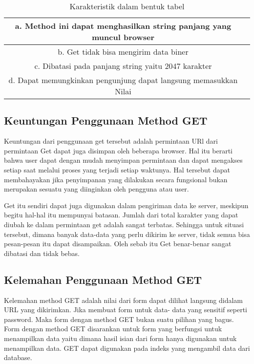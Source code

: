 \begin{table} [ht]
\caption{Karakteristik dalam bentuk tabel}
\centering
\begin {tabular} {|cc|}
\hline
a.	Method ini dapat menghasilkan string panjang yang muncul browser & \\
\hline
b.	Get tidak bisa mengirim data biner &\\
\hline
c.	Dibatasi pada panjang string yaitu 2047 karakter & \\
\hline
d.	Dapat memungkinkan pengunjung dapat langsung memasukkan Nilai & \\
\hline
\end{tabular}
\label{ltabel}
\end{table}

\subsection{Keuntungan Penggunaan Method GET}
Keuntungan dari penggunaan get tersebut adalah permintaan URl dari permintaan Get dapat juga disimpan oleh beberapa browser.
Hal itu berarti bahwa user dapat dengan mudah menyimpan permintaan dan dapat mengakses setiap saat melalui proses yang terjadi setiap 
waktunya. Hal tersebut dapat membahayakan jika penyimpanan yang dilakukan secara fungsional bukan merupakan sesuatu yang diinginkan oleh 
pengguna atau user.

Get itu sendiri dapat juga digunakan dalam pengiriman data ke server, meskipun begitu hal-hal itu mempunyai batasan. 
Jumlah dari total karakter yang dapat diubah ke dalam permintaan get adalah sangat terbatas. Sehingga untuk situasi tersebut, dimana 
banyak data-data yang perlu dikirim  ke server, tidak semua bisa pesan-pesan itu dapat disampaikan. Oleh sebab itu Get benar-benar 
sangat dibatasi dan tidak bebas.

\subsection{Kelemahan Penggunaan Method GET}
Kelemahan method GET adalah nilai dari form dapat dilihat langsung didalam URL yang dikirimkan. Jika membuat form untuk data-
data yang  sensitif seperti password. Maka form  dengan method GET bukan suatu pilihan yang bagus. Form dengan method GET 
disarankan untuk form yang berfungsi untuk menampilkan data  yaitu dimana hasil isian dari form hanya digunakan untuk  
menampilkan data.  GET dapat digunakan pada indeks yang mengambil data dari database.

